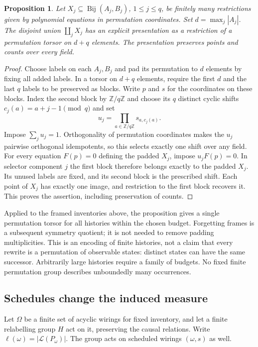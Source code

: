 \documentclass[11pt]{article}
\newtheorem{proposition}[theorem]{Proposition}
\theoremstyle{definition}
\newcommand{\Bij}{\operatorname{Bij}}
\newcommand{\Lin}{\mathcal L}
\newcommand{\Z}{\mathbb Z}
\numberwithin{equation}{section}
\begin{document}
\begin{proposition}\label{prop:finiteunion}
Let $X_j\subseteq\Bij(A_j,B_j)$, $1\le j\le q$, be finitely many
restrictions given by polynomial equations in permutation coordinates.
Set $d=\max_j|A_j|$. The disjoint union $\coprod_j X_j$ has an
explicit presentation as a restriction of a permutation torsor
on $d+q$ elements. The presentation preserves points and counts
over every field.
\end{proposition}
\begin{proof}
Choose labels on each $A_j,B_j$ and pad its permutation to $d$
elements by fixing all added labels. In a torsor on $d+q$ elements,
require the first $d$ and the last $q$ labels to be preserved as
blocks. Write $p$ and $s$ for the coordinates on these blocks.
Index the second block by $\Z/q\Z$ and choose its $q$ distinct cyclic shifts
$c_j(a)=a+j-1\pmod q$ and set
\[
 u_j=\prod_{a\in\Z/q\Z} s_{a,c_j(a)}.
\]
Impose $\sum_j u_j=1$. Orthogonality of permutation coordinates
makes the $u_j$ pairwise orthogonal idempotents, so this selects
exactly one shift over any field. For every equation $F(p)=0$
defining the padded $X_j$, impose $u_jF(p)=0$.
In selector component $j$ the first block therefore belongs exactly
to the padded $X_j$. Its unused labels are fixed, and its second
block is the prescribed shift. Each point of $X_j$ has exactly
one image, and restriction to the first block recovers it.
This proves the assertion, including preservation of counts.
\end{proof}

Applied to the framed inventories above, the proposition gives a
single permutation torsor for all histories within the chosen
budget. Forgetting frames is a subsequent symmetry quotient;
it is not needed to remove padding multiplicities. This is an
encoding of finite histories, not a claim that every rewrite is
a permutation of observable states: distinct states can have the
same successor. Arbitrarily large histories require a family of
budgets. No fixed finite permutation group describes unboundedly
many occurrences.

\subsection{Schedules change the induced measure}
Let $\Omega$ be a finite set of acyclic wirings for fixed inventory,
and let a finite relabelling group $H$ act on it, preserving the
causal relations. Write $\ell(\omega)=|\Lin(P_\omega)|$.
The group acts on scheduled wirings $(\omega,s)$ as well.
\end{document}
